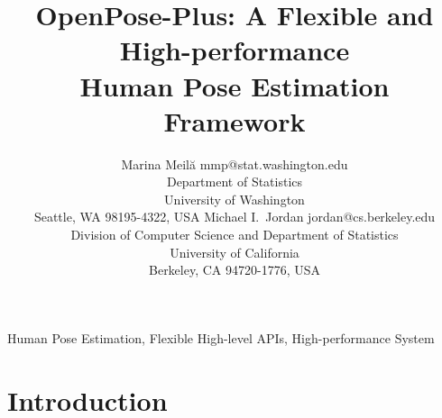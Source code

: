 \documentclass[twoside,11pt]{article}
\begin{document}
\title{OpenPose-Plus: A Flexible and High-performance \\
Human Pose Estimation Framework}

\author{\name Marina Meil\u{a} \email mmp@stat.washington.edu \\
       \addr Department of Statistics\\
       University of Washington\\
       Seattle, WA 98195-4322, USA
       \AND
       \name Michael I.\ Jordan \email jordan@cs.berkeley.edu \\
       \addr Division of Computer Science and Department of Statistics\\
       University of California\\
       Berkeley, CA 94720-1776, USA}


\maketitle

\begin{abstract}%
\end{abstract}

\begin{keywords}
  Human Pose Estimation, Flexible High-level APIs, High-performance System
\end{keywords}

\section{Introduction}
\end{document}
